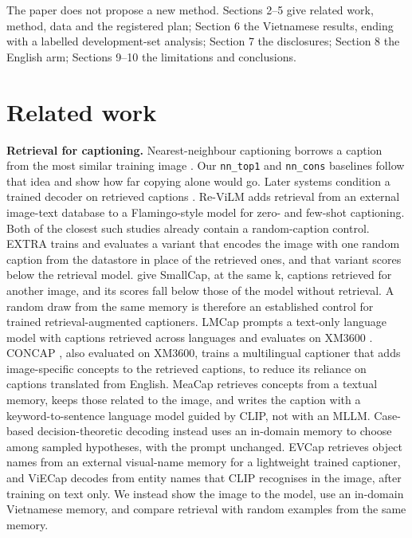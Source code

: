 \documentclass[manuscript,screen]{acmart}
\begin{document}
The paper does not propose a new method. Sections 2--5 give related work, method, data and the
registered plan; Section 6 the Vietnamese results, ending with a labelled development-set analysis;
Section 7 the disclosures; Section 8 the English arm; Sections 9--10 the limitations and
conclusions.

\section{Related work}\label{related-work}

\textbf{Retrieval for captioning.} Nearest-neighbour captioning borrows a caption from the most
similar training image \citep{Devlin2015NN}. Our \texttt{nn\_top1} and \texttt{nn\_cons} baselines
follow that idea and show how far copying alone would go. Later systems condition a trained decoder
on retrieved captions \citep{Ramos2023EXTRA, Ramos2023SmallCap}. Re-ViLM \citep{Yang2023ReViLM} adds
retrieval from an external image-text database to a Flamingo-style model for zero- and few-shot
captioning. Both of the closest such studies already contain a random-caption control. EXTRA
\citep{Ramos2023EXTRA} trains and evaluates a variant that encodes the image with one random caption
from the datastore in place of the retrieved ones, and that variant scores below the retrieval
model. \citet{Li2024RetrievalRobustness} give SmallCap, at the same k, captions retrieved for
another image, and its scores fall below those of the model without retrieval. A random draw from
the same memory is therefore an established control for trained retrieval-augmented captioners.
LMCap prompts a text-only language model with captions retrieved across languages and evaluates on
XM3600 \citep{Ramos2023LMCap}. CONCAP \citep{Ibrahim2025CONCAP}, also evaluated on XM3600, trains a
multilingual captioner that adds image-specific concepts to the retrieved captions, to reduce its
reliance on captions translated from English. MeaCap \citep{Zeng2024MeaCap} retrieves concepts from
a textual memory, keeps those related to the image, and writes the caption with a
keyword-to-sentence language model guided by CLIP, not with an MLLM. Case-based decision-theoretic
decoding \citep{Deguchi2025CBDT} instead uses an in-domain memory to choose among sampled
hypotheses, with the prompt unchanged. EVCap \citep{Li2024EVCap} retrieves object names from an
external visual-name memory for a lightweight trained captioner, and ViECap \citep{Fei2023ViECap}
decodes from entity names that CLIP recognises in the image, after training on text only. We instead
show the image to the model, use an in-domain Vietnamese memory, and compare retrieval with random
examples from the same memory.
\end{document}
